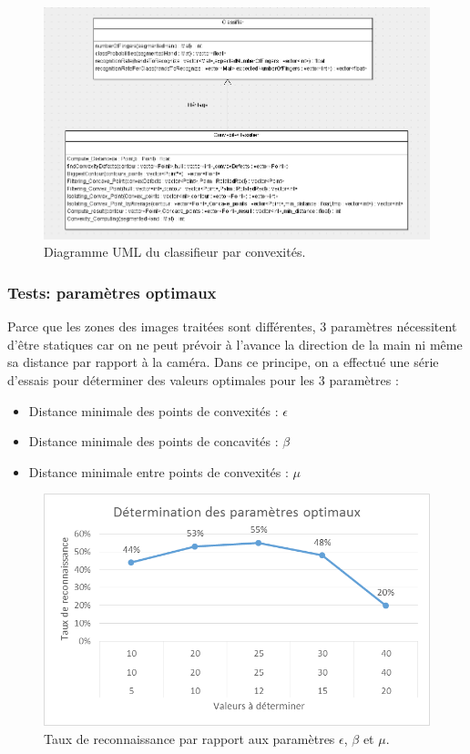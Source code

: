 \begin{figure}
\centerline{\includegraphics[scale=0.6]{umlConvexity.png}}
\caption{Diagramme UML du classifieur par convexités.}
\end{figure}

\subsubsection{Tests: paramètres optimaux}

Parce que les zones des images traitées sont différentes, 3 paramètres nécessitent d’être statiques car on ne peut prévoir à l’avance la direction de la main ni même sa distance par rapport à la caméra.
Dans ce principe, on a effectué une série d’essais pour déterminer des valeurs optimales pour les 3 paramètres :
\begin{itemize}
\item Distance minimale des points de convexités : $\epsilon$
\item Distance minimale des points de concavités : $\beta$
\item Distance minimale entre points de convexités : $\mu$
\end{itemize}

\begin{figure}[htb!]
\centerline{\includegraphics{convexiteParams.png}}
\caption{Taux de reconnaissance par rapport aux paramètres $\epsilon$, $\beta$ et $\mu$.}
\label{fig:convexiteParams}
\end{figure}

